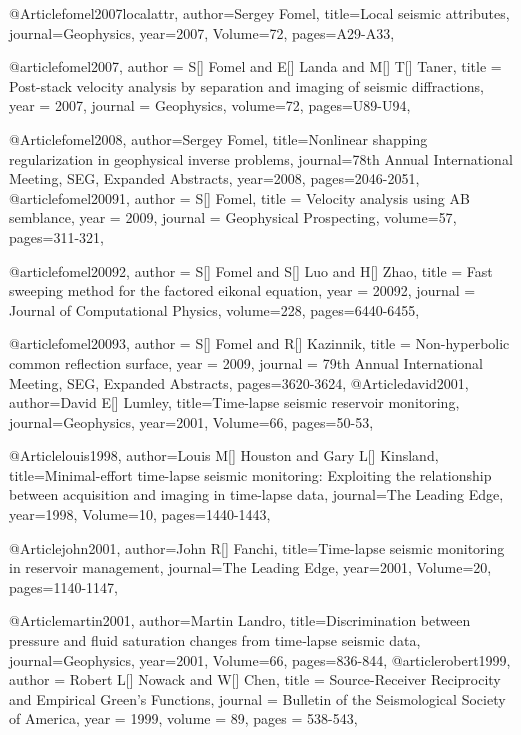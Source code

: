 @Article{fomel2007localattr,
  author={Sergey Fomel},
  title={Local seismic attributes},
  journal={Geophysics},
  year=2007,
  Volume=72,
  pages={A29-A33},
}

@article{fomel2007,
  author =	 {S[] Fomel and E[] Landa and M[] T[] Taner},
  title =	 {Post-stack velocity analysis by separation and imaging of seismic diffractions},
  year =	 2007,
  journal =	 {Geophysics},
  volume={72},
 pages=U89-U94,
}


@Article{fomel2008,
  author={Sergey Fomel},
  title={Nonlinear shapping regularization in geophysical inverse problems},
  journal={78th Annual International Meeting, SEG, Expanded Abstracts},
  year=2008,
  pages={2046-2051},
}
@article{fomel20091,
  author =	 {S[] Fomel},
  title =	 {Velocity analysis using AB semblance},
  year =	 2009,
  journal =	 {Geophysical Prospecting},
  volume={57},
 pages=311-321,
}

@article{fomel20092,
  author =	 {S[] Fomel and S[] Luo and H[] Zhao},
  title =	 {Fast sweeping method for the factored eikonal equation},
  year =	 20092,
  journal =	 {Journal of Computational Physics},
  volume={228},
 pages=6440-6455,
}

@article{fomel20093,
  author =	 {S[] Fomel and R[] Kazinnik},
  title =	 {Non-hyperbolic common reflection surface},
  year =	 2009,
  journal =	 {79th Annual International Meeting, SEG, Expanded Abstracts},
 pages=3620-3624,
}
@Article{david2001,
  author={David E[] Lumley},
  title={Time-lapse seismic reservoir monitoring},
  journal={Geophysics},
  year=2001,
  Volume=66,
  pages={50-53},
}

@Article{louis1998,
  author={Louis M[] Houston and Gary L[] Kinsland},
  title={Minimal-effort time-lapse seismic monitoring: Exploiting the relationship between acquisition and imaging in time-lapse data},
  journal={The Leading Edge},
  year=1998,
  Volume=10,
  pages={1440-1443},
}

@Article{john2001,
  author={John R[] Fanchi},
  title={Time-lapse seismic monitoring in reservoir management},
  journal={The Leading Edge},
  year=2001,
  Volume=20,
  pages={1140-1147},
}

@Article{martin2001,
  author={Martin Landro},
  title={Discrimination between pressure and fluid saturation changes from time‐lapse seismic data},
  journal={Geophysics},
  year=2001,
  Volume=66,
  pages={836-844},
}
@article{robert1999,
  author =	 {Robert L[] Nowack and W[] Chen},
  title =	 {Source-Receiver Reciprocity and Empirical {G}reen's Functions},
  journal = 	 {Bulletin of the Seismological Society of America},
  year = 	 1999,
  volume =	 89,
  pages =	 {538-543},
}

